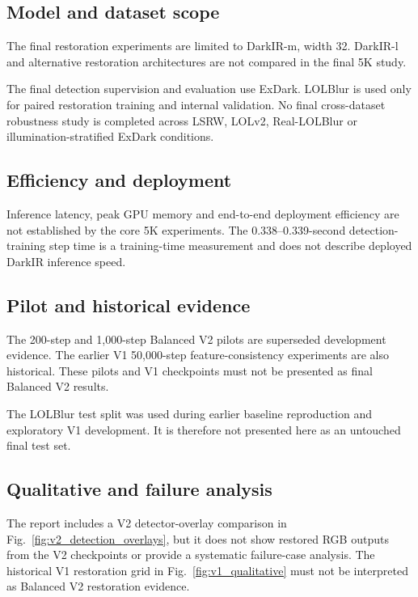 \subsection{Model and dataset scope}

The final restoration experiments are limited to DarkIR-m, width 32.
DarkIR-l and alternative restoration architectures are not compared in
the final 5K study.

The final detection supervision and evaluation use ExDark. LOLBlur is used
only for paired restoration training and internal validation. No final
cross-dataset robustness study is completed across LSRW, LOLv2,
Real-LOLBlur or illumination-stratified ExDark conditions.

\subsection{Efficiency and deployment}

Inference latency, peak GPU memory and end-to-end deployment efficiency
are not established by the core 5K experiments. The 0.338--0.339-second
detection-training step time is a training-time measurement and does not
describe deployed DarkIR inference speed.

\subsection{Pilot and historical evidence}

The 200-step and 1,000-step Balanced V2 pilots are superseded development
evidence. The earlier V1 50,000-step feature-consistency experiments are
also historical. These pilots and V1 checkpoints must not be presented as
final Balanced V2 results.

The LOLBlur test split was used during earlier baseline reproduction and
exploratory V1 development. It is therefore not presented here as an
untouched final test set.

\subsection{Qualitative and failure analysis}

The report includes a V2 detector-overlay comparison in
Fig.~\ref{fig:v2_detection_overlays}, but it does not show restored RGB
outputs from the V2 checkpoints or provide a systematic failure-case
analysis. The historical V1 restoration grid in
Fig.~\ref{fig:v1_qualitative} must not be interpreted as Balanced V2
restoration evidence.

